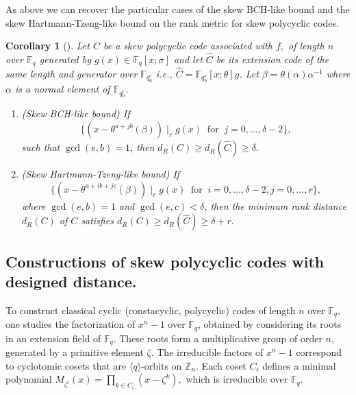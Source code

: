 \documentclass[12pt,paper]{article}
\newcommand{\hlc}[2][yellow]{ {\sethlcolor{#1} \hl{#2}} }
\theoremstyle{plain}
\newtheorem{corollary}[theorem]{Corollary}
\newcommand{\Fq}{\mathbb{F}_{q}}
\begin{document}
As above we can recover the particular cases of the skew BCH-like bound and the skew Hartmann-Tzeng-like bound on the rank metric for skew polycyclic codes. 

\begin{corollary} [\cite{Alfarano2021, Cathryn2024,  Lobillo2025}] \label{CorRank_Bch}
Let $C$ be a skew polycyclic code associated with $f,$ of length $n$ over $\Fq$ generated by $  g(x) \in \mathbb{F}_{q}[x;\sigma]$  and let $ \widehat{C} $ be its extension code of the same length and generator over $ \mathbb{F}_{q_0^e}$ i.e., $\widehat{C}= \mathbb{F}_{q_0^e}[x;\theta] g$.  Let $\beta= \theta(\alpha)\alpha^{-1}$ where $\alpha$ is a normal element of $ \mathbb{F}_{q_0^e}$.
\begin{enumerate}
    \item (Skew BCH-like bound) If   $$ \{(x-\theta^{a+jb}(\beta)) \mid_r g(x) ~\text{ for }~ j=0,\ldots, \delta-2\},$$
 such that  $\gcd(e, b)=1$,  then $ d_R(C)\geq   d_R(\widehat{C}) \geq {\delta}.$ 
 
 \item  (Skew Hartmann-Tzeng-like bound)    If   $$ \{ (x-{\theta^{a+ib+jc}(\beta)}) \mid_r g(x)  ~\text{ for }~ i=0,\ldots,{\delta-2}, j=0,\ldots, {r}\},$$ 
	where   $\gcd(e, b)=1 $ and $\gcd(e, c)<\delta$, 
    then  the minimum rank distance $d_R(C)$ of  $C$ satisfies $d_R(C)\geq   d_R(\widehat{C})  \geq {\delta}+ {r}. $ 
\end{enumerate}
\end{corollary}

\subsection{Constructions of skew polycyclic codes with designed distance. }

To construct classical cyclic (constacyclic, polycyclic) codes of length $n$ over $\mathbb{F}_q$, one studies the factorization of $x^n - 1$ over $\mathbb{F}_q$, obtained by considering its roots in an extension field of $\mathbb{F}_q$. These roots form a multiplicative group of order $n$, generated by a primitive element $\zeta$. The irreducible factors of $x^n - 1$ correspond to cyclotomic cosets that are $\langle q \rangle$-orbits on $\mathbb{Z}_n$. Each coset $C_i$ defines a minimal polynomial  $
M_{\zeta^i}(x) = \prod_{k \in C_i} (x - \zeta^k), $ which is irreducible over $\mathbb{F}_q$. 
\end{document}
